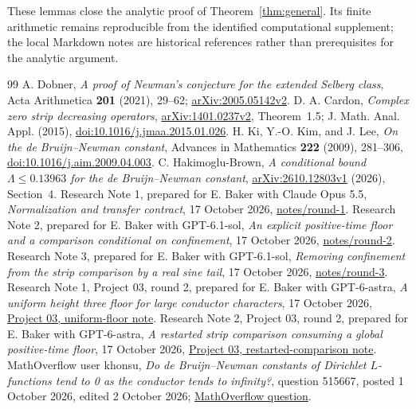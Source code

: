 \documentclass[11pt]{article}
\theoremstyle{remark}\newtheorem{remark}[theorem]{Remark}
\begin{document}
These lemmas close the analytic proof of Theorem~\ref{thm:general}.
Its finite arithmetic remains reproducible from the identified
computational supplement; the local Markdown notes are historical
references rather than prerequisites for the analytic argument.

\begin{thebibliography}{99}
 A. Dobner,
\emph{A proof of Newman's conjecture for the extended Selberg class},
Acta Arithmetica \textbf{201} (2021), 29--62;
\href{https://arxiv.org/abs/2005.05142v2}{arXiv:2005.05142v2}.
 D. A. Cardon,
\emph{Complex zero strip decreasing operators},
\href{https://arxiv.org/abs/1401.0237v2}{arXiv:1401.0237v2}, Theorem~1.5;
J. Math. Anal. Appl. (2015),
\href{https://doi.org/10.1016/j.jmaa.2015.01.026}{doi:10.1016/j.jmaa.2015.01.026}.
 H. Ki, Y.-O. Kim, and J. Lee,
\emph{On the de Bruijn--Newman constant}, Advances in Mathematics
\textbf{222} (2009), 281--306,
\href{https://doi.org/10.1016/j.aim.2009.04.003}{doi:10.1016/j.aim.2009.04.003}.
 C. Hakimoglu-Brown,
\emph{A conditional bound $\Lambda\le0.13963$ for the de Bruijn--Newman constant},
\href{https://arxiv.org/abs/2610.12803v1}{arXiv:2610.12803v1} (2026), Section~4.
 Research Note 1, prepared for E. Baker with Claude Opus 5.5,
\emph{Normalization and transfer contract}, 17 October 2026,
\href{../notes/round-1/01_NORMALIZATION_AND_TRANSFER_CONTRACT_CLAUDE_20261017.md}{notes/round-1}.
 Research Note 2, prepared for E. Baker with GPT-6.1-sol,
\emph{An explicit positive-time floor and a comparison conditional on confinement},
17 October 2026,
\href{../notes/round-2/02_BURGERS_FLOOR_AND_CONDITIONAL_COMPARISON_CODEX_20261017.md}{notes/round-2}.
 Research Note 3, prepared for E. Baker with GPT-6.1-sol,
\emph{Removing confinement from the strip comparison by a real sine tail},
17 October 2026,
\href{../notes/round-3/03_SINE_TAIL_LIMIT_AND_COMPARISON_CODEX_20261017.md}{notes/round-3}.
 Research Note 1, Project 03, round 2, prepared for
E. Baker with GPT-6-astra, \emph{A uniform height three floor for large
conductor characters}, 17 October 2026,
\href{../../03_effective_outer_remainders/notes/round-2/01_UNIFORM_FAMILY_FLOOR_CODEX_20261017.md}{Project 03, uniform-floor note}.
 Research Note 2, Project 03, round 2, prepared for
E. Baker with GPT-6-astra, \emph{A restarted strip comparison consuming
a global positive-time floor}, 17 October 2026,
\href{../../03_effective_outer_remainders/notes/round-2/02_RESTARTED_STRIP_COMPARISON_CODEX_20261017.md}{Project 03, restarted-comparison note}.
 MathOverflow user khonsu,
\emph{Do de Bruijn--Newman constants of Dirichlet $L$-functions tend to
0 as the conductor tends to infinity?}, question 515667,
posted 1 October 2026, edited 2 October 2026;
\href{https://mathoverflow.net/questions/515667/do-de-bruijn-newman-constants-of-dirichlet-l-functions-tend-to-0-as-the-cond}{MathOverflow question}.
\end{thebibliography}
\end{document}
